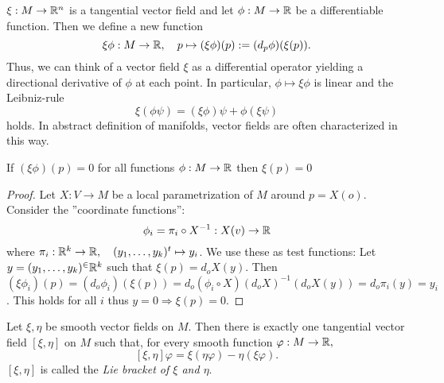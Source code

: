 \begin{remark}
	
	$ \xi: M \rightarrow \mathbb R^n $ is a tangential vector field and let $ \phi : M \rightarrow \mathbb R $ be a differentiable function. Then we define a new function
		\[ \xi\phi: M \rightarrow \mathbb R, \quad p \mapsto (\xi\phi)(p) := (d_p\phi)(\xi(p)). \]
	Thus, we can think of a vector field $ \xi $ as a differential operator yielding a directional derivative of $ \phi $ at each point. In particular, $ \phi \mapsto \xi\phi $ is linear and the Leibniz-rule
		\[ \xi(\phi\psi) = (\xi\phi)\psi + \phi(\xi\psi) \]
	holds.
	In abstract definition of manifolds, vector fields are often characterized in this way.
	
\end{remark}

\begin{lemma}
	If $ (\xi\phi)(p) = 0 $ for all functions $ \phi: M \rightarrow\mathbb R $ then $ \xi(p) = 0 $
\end{lemma}
\begin{proof}
	
	Let $ X : V \rightarrow M $ be a local parametrization of $ M $ around $ p = X(o) $.
	Consider the ''coordinate functions'':
		\[ \phi_i = \pi_i \circ X^{-1}: X(v) \rightarrow \mathbb R \]
	where $ \pi_i:\mathbb R^k \rightarrow \mathbb R, \quad (y_1, \dots, y_k)^t \mapsto y_i $.
	We use these as test functions: Let  $ y = (y_1, \dots, y_k)^ \in \mathbb R^k $ such that $ \xi(p) = d_oX(y). $ Then $ (\xi\phi_i)(p) = (d_o\phi_i)(\xi(p))= d_o(\phi_i \circ X)(d_oX)^{-1}(d_oX(y)) = d_o\pi_i(y) = y_i $. This holds for all $ i $ thus $ y = 0 \Rightarrow \xi(p) = 0 $.
	
\end{proof}

\begin{lemma, definition}
	
	Let $ \xi, \eta $ be smooth vector fields on $ M $. Then there is exactly one tangential vector field $ [\xi,\eta] $ on $ M $ such that, for every smooth function $ \varphi:M \rightarrow \mathbb R, $
		\[ [\xi,\eta]\varphi = \xi(\eta\varphi)-\eta(\xi\varphi). \]
	$ [\xi,\eta] $ is called the \emph{Lie bracket of $ \xi $ and $ \eta $}.
	
\end{lemma, definition}

